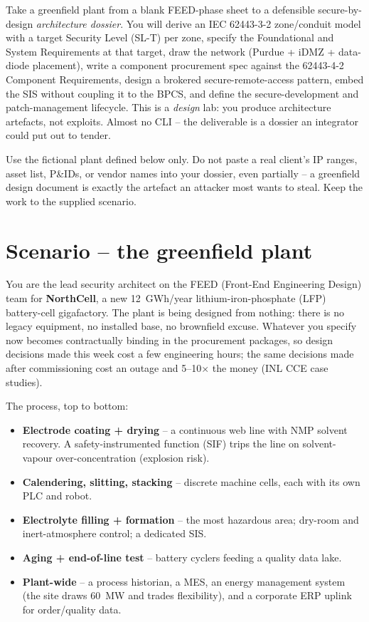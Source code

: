 \documentclass[11pt,a4paper]{article}
\begin{document}
\labheader

\begin{goalbox}
Take a greenfield plant from a blank FEED-phase sheet to a defensible
secure-by-design \emph{architecture dossier}. You will derive an IEC
62443-3-2 zone/conduit model with a target Security Level (SL-T) per
zone, specify the Foundational and System Requirements at that target,
draw the network (Purdue + iDMZ + data-diode placement), write a
component procurement spec against the 62443-4-2 Component Requirements,
design a brokered secure-remote-access pattern, embed the SIS without
coupling it to the BPCS, and define the secure-development and
patch-management lifecycle. This is a \emph{design} lab: you produce
architecture artefacts, not exploits. Almost no CLI -- the deliverable
is a dossier an integrator could put out to tender.
\end{goalbox}

\begin{warnbox}
Use the fictional plant defined below only. Do not paste a real client's
IP ranges, asset list, P\&IDs, or vendor names into your dossier, even
partially -- a greenfield design document is exactly the artefact an
attacker most wants to steal. Keep the work to the supplied scenario.
\end{warnbox}

\section*{Scenario -- the greenfield plant}

You are the lead security architect on the FEED (Front-End Engineering
Design) team for \textbf{NorthCell}, a new 12~GWh/year lithium-iron-phosphate
(LFP) battery-cell gigafactory. The plant is being designed from
nothing: there is no legacy equipment, no installed base, no brownfield
excuse. Whatever you specify now becomes contractually binding in the
procurement packages, so design decisions made this week cost a few
engineering hours; the same decisions made after commissioning cost an
outage and 5--10$\times$ the money (INL CCE case studies).

The process, top to bottom:
\begin{itemize}\setlength{\itemsep}{1pt}
  \item \textbf{Electrode coating + drying} -- a continuous web line with
    NMP solvent recovery. A safety-instrumented function (SIF) trips the
    line on solvent-vapour over-concentration (explosion risk).
  \item \textbf{Calendering, slitting, stacking} -- discrete machine cells,
    each with its own PLC and robot.
  \item \textbf{Electrolyte filling + formation} -- the most hazardous
    area; dry-room and inert-atmosphere control; a dedicated SIS.
  \item \textbf{Aging + end-of-line test} -- battery cyclers feeding a
    quality data lake.
  \item \textbf{Plant-wide} -- a process historian, a MES, an energy
    management system (the site draws 60~MW and trades flexibility),
    and a corporate ERP uplink for order/quality data.
\end{itemize}
\end{document}
